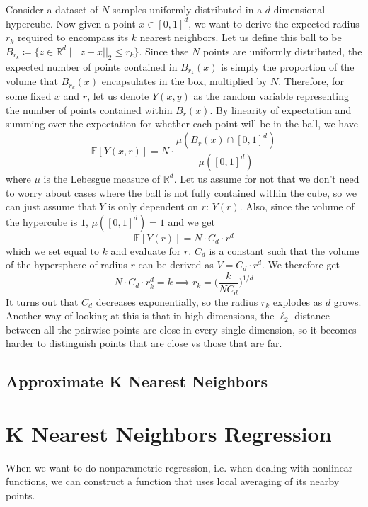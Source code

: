 \documentclass{article}
\begin{document}
  \begin{example}
    Consider a dataset of $N$ samples uniformly distributed in a $d$-dimensional hypercube. Now given a point $x \in [0, 1]^d$, we want to derive the expected radius $r_k$ required to encompass its $k$ nearest neighbors. Let us define this ball to be $B_{r_k} \coloneqq \{ z \in \mathbb{R}^d \mid ||z - x ||_2 \leq r_k \}$. Since thse $N$ points are uniformly distributed, the expected number of points contained in $B_{r_k} (x)$ is simply the proportion of the volume that $B_{r_k} (x)$ encapsulates in the box, multiplied by $N$. Therefore, for some fixed $x$ and $r$, let us denote $Y(x, y)$ as the random variable representing the number of points contained within $B_r (x)$. By linearity of expectation and summing over the expectation for whether each point will be in the ball, we have 
    \[\mathbb{E}[Y (x, r)] = N \cdot \frac{\mu(B_r (x) \cap [0, 1]^d) }{\mu([0, 1]^d)}\]
    where $\mu$ is the Lebesgue measure of $\mathbb{R}^d$. Let us assume for not that we don't need to worry about cases where the ball is not fully contained within the cube, so we can just assume that $Y$ is only dependent on $r$: $Y(r)$. Also, since the volume of the hypercube is $1$,  $\mu([0, 1]^d) = 1$ and we get 
    \[\mathbb{E}[Y(r)] = N \cdot C_d \cdot r^d\]
    which we set equal to $k$ and evaluate for $r$. $C_d$ is a constant such that the volume of the hypersphere of radius $r$ can be derived as $V = C_d \cdot r^d$. We therefore get 
    \[N \cdot C_d \cdot r_k^d = k \implies r_k = \bigg( \frac{k}{N C_d} \bigg)^{1/d}\]
    It turns out that $C_d$ decreases exponentially, so the radius $r_k$ explodes as $d$ grows. Another way of looking at this is that in high dimensions, the $\ell_2$ distance between all the pairwise points are close in every single dimension, so it becomes harder to distinguish points that are close vs those that are far.  
  \end{example} 

  \subsection{Approximate K Nearest Neighbors}

\section{K Nearest Neighbors Regression}

  When we want to do nonparametric regression, i.e. when dealing with nonlinear functions, we can construct a function that uses local averaging of its nearby points. 
\end{document}

